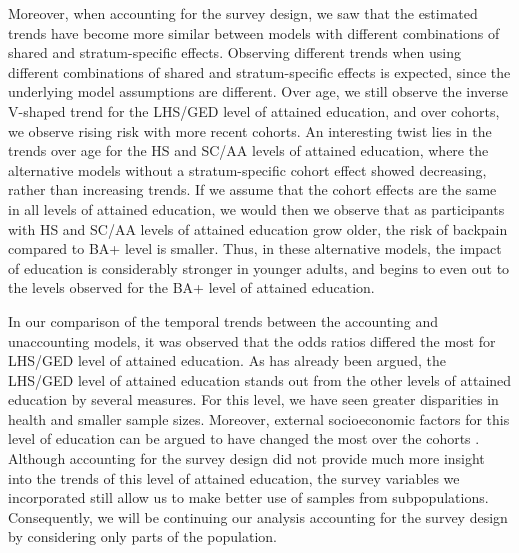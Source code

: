 \vspace{-0.2cm}
Moreover, when accounting for the survey design, we saw that the estimated trends have become more similar between models with different combinations of shared and stratum-specific effects. Observing different trends when using different combinations of shared and stratum-specific effects is expected, since the underlying model assumptions are different. Over age, we still observe the inverse V-shaped trend for the LHS/GED level of attained education, and over cohorts, we observe rising risk with more recent cohorts. An interesting twist lies in the trends over age for the HS and SC/AA levels of attained education, where the alternative models without a stratum-specific cohort effect showed decreasing, rather than increasing trends. If we assume that the cohort effects are the same in all levels of attained education, we would then we observe that as participants with HS and SC/AA levels of attained education grow older, the risk of backpain compared to BA+ level is smaller. Thus, in these alternative models, the impact of education is considerably stronger in younger adults, and begins to even out to the levels observed for the BA+ level of attained education.

\vspace{-0.2cm}
In our comparison of the temporal trends between the accounting and unaccounting models, it was observed that the odds ratios differed the most for LHS/GED level of attained education. As has already been argued, the LHS/GED level of attained education stands out from the other levels of attained education by several measures. For this level, we have seen greater disparities in health and smaller sample sizes. Moreover, external socioeconomic factors for this level of education can be argued to have changed the most over the cohorts \citep{dowd2014life,montez2011trends,hendi2015trends}. Although accounting for the survey design did not provide much more insight into the trends of this level of attained education, the survey variables we incorporated still allow us to make better use of samples from subpopulations. Consequently, we will be continuing our analysis accounting for the survey design by considering only parts of the population.

\FloatBarrier

